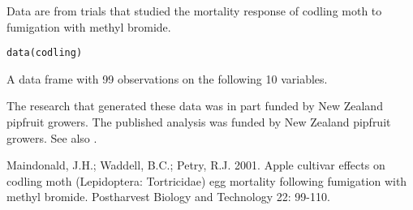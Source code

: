 \begin{Description}\relax
Data are from trials that studied the mortality response of codling moth
to fumigation with methyl bromide.
\end{Description}
\begin{Usage}
\begin{verbatim}data(codling)\end{verbatim}
\end{Usage}
\begin{Format}\relax
A data frame with 99 observations on the following 10 variables.
\end{Format}
\begin{Details}\relax
The research that generated these data was in part funded by New Zealand
pipfruit growers.  The published analysis was funded by New Zealand
pipfruit growers. See also .
\end{Details}
\begin{Source}\relax
Maindonald, J.H.; Waddell, B.C.; Petry, R.J. 2001.
Apple cultivar effects on codling moth (Lepidoptera: Tortricidae)
egg mortality following fumigation with methyl bromide.
Postharvest Biology and Technology 22: 99-110.
\end{Source}

